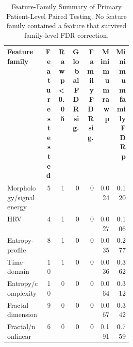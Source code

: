 \begin{table}
\caption{Feature-Family Summary of Primary Patient-Level Paired Testing. No feature family contained a feature that survived family-level FDR correction.}
\label{tab:fdr_summary_by_feature_family}
\begin{tabular}{p{0.30\linewidth}rrrrrr}
\toprule
Feature family & Features tested & Raw p < 0.05 & Global FDR sig. & Family FDR sig. & Minimum raw p & Minimum family FDR p \\
\midrule
Morphology/signal energy & 5 & 1 & 0 & 0 & 0.024 & 0.120 \\
HRV & 4 & 1 & 0 & 0 & 0.027 & 0.106 \\
Entropy-profile & 8 & 1 & 0 & 0 & 0.035 & 0.277 \\
Time-domain & 10 & 1 & 0 & 0 & 0.036 & 0.362 \\
Entropy/complexity & 10 & 0 & 0 & 0 & 0.064 & 0.312 \\
Fractal dimension & 9 & 0 & 0 & 0 & 0.067 & 0.342 \\
Fractal/nonlinear & 6 & 0 & 0 & 0 & 0.191 & 0.759 \\
\bottomrule
\end{tabular}
\end{table}

